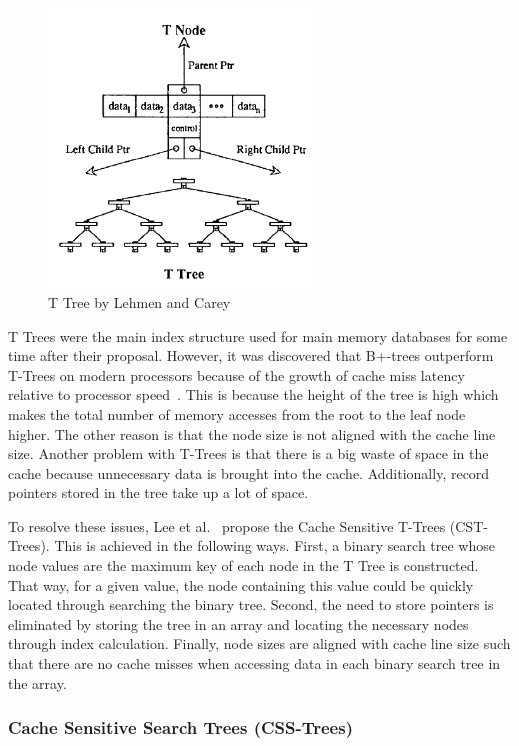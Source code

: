 \documentclass[12pt,a4paper]{article}
\begin{document}
\begin{figure}[!t]
\centering
\includegraphics[width=7cm]{figs/Ttree.png}
\caption{T Tree by Lehmen and Carey~\cite{lehman1986study}}
\label{fig:ttree}
\end{figure}

T Trees were the main index structure used for main memory databases for some time after their proposal. However, it was discovered that B+-trees outperform
T-Trees on modern processors because of the growth of cache miss latency relative to processor speed~\cite{rao1999cache,lee2007cst}. This is because the height
of the tree is high which makes the total number of memory accesses from the root to the leaf node higher. The other reason is that the node size is not aligned
with the cache line size. Another problem with T-Trees is that there is a big waste of space in the cache because unnecessary data is brought into the cache.
Additionally, record pointers stored in the tree take up a lot of space.

To resolve these issues, Lee et al.~\cite{lee2007cst} propose the Cache Sensitive T-Trees (CST-Trees). This is achieved in the following ways. First, a binary
search tree whose node values are the maximum key of each node in the T Tree is constructed. That way, for a given value, the node containing this value could
be quickly located through searching the binary tree. Second, the need to store pointers is eliminated by storing the tree in an array and locating the
necessary nodes through index calculation. Finally, node sizes are aligned with cache line size such that there are no cache misses when accessing data in each
binary
search tree in the array.

\subsubsection*{Cache Sensitive Search Trees (CSS-Trees)}
\end{document}
